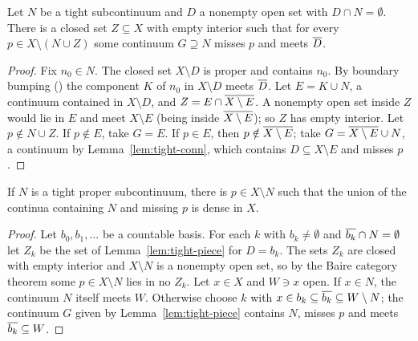
\begin{lemma}\label{lem:tight-piece}
Let $N$ be a tight subcontinuum and $D$ a nonempty open set with $D\cap N=\emptyset$. There is a closed set $Z\subseteq X$
with empty interior such that for every $p\in X\setminus(N\cup Z)$ some continuum $G\supseteq N$ misses $p$ and meets $\overline{D}$.
\end{lemma}

\begin{proof}
Fix $n_0\in N$. The closed set $X\setminus D$ is proper and contains $n_0$. By boundary bumping
() the component $K$ of $n_0$ in $X\setminus D$ meets $\overline{D}$. Let $E=K\cup N$, a continuum
contained in $X\setminus D$, and $Z=E\cap\overline{X\setminus E}$. A nonempty open set inside $Z$ would lie in $E$ and meet
$X\setminus E$ (being inside $\overline{X\setminus E}$); so $Z$ has empty interior. Let $p\notin N\cup Z$. If $p\notin E$,
take $G=E$. If $p\in E$, then $p\notin\overline{X\setminus E}$; take $G=\overline{X\setminus E}\cup N$, a continuum by
Lemma~\ref{lem:tight-conn}, which contains $D\subseteq X\setminus E$ and misses $p$.
\end{proof}


\begin{lemma}\label{lem:tight-case}
If $N$ is a tight proper subcontinuum, there is $p\in X\setminus N$ such that the union of the continua containing $N$
and missing $p$ is dense in $X$.
\end{lemma}

\begin{proof}
Let $b_0,b_1,\dots$ be a countable basis. For each $k$ with $b_k\ne\emptyset$ and $\overline{b_k}\cap N=\emptyset$ let $Z_k$ be the
set of Lemma~\ref{lem:tight-piece} for $D=b_k$. The sets $Z_k$ are closed with empty interior and $X\setminus N$ is a
nonempty open set, so by the Baire category theorem some $p\in X\setminus N$ lies in no $Z_k$. Let $x\in X$ and $W\ni x$
open. If $x\in N$, the continuum $N$ itself meets $W$. Otherwise choose $k$ with $x\in b_k\subseteq\overline{b_k}\subseteq W\setminus N$; the
continuum $G$ given by Lemma~\ref{lem:tight-piece} contains $N$, misses $p$ and meets $\overline{b_k}\subseteq W$.
\end{proof}


